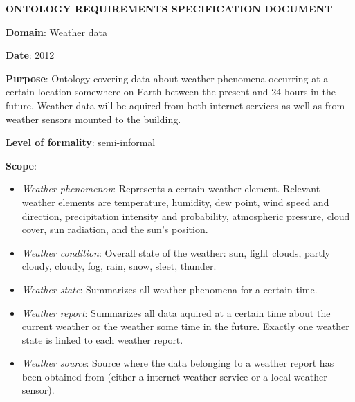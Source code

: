 \begin{mdframed}
\setlength{\parindent}{0pt}
\MakeUppercase{\textbf{Ontology requirements specification document}}

\vspace{.5cm}

\textbf{Domain}: Weather data

\vspace{.2cm}

\textbf{Date}: 2012 %

\vspace{.2cm}

\textbf{Purpose}: Ontology covering data about weather phenomena occurring at a certain location somewhere on Earth between the present and 24 hours in the future. Weather data will be aquired from both internet services as well as from weather sensors mounted to the building.

\vspace{.2cm}

\textbf{Level of formality}: semi-informal %

\vspace{.2cm}

\textbf{Scope}:

\begin{itemize}
  \item \emph{Weather phenomenon}: Represents a certain weather element. Relevant weather elements are temperature, humidity, dew point, wind speed and direction, precipitation intensity and probability, atmospheric pressure, cloud cover, sun radiation, and the sun's position.

  \item \emph{Weather condition}: Overall state of the weather: sun, light clouds, partly cloudy, cloudy, fog, rain, snow, sleet, thunder.
  \item \emph{Weather state}: Summarizes all weather phenomena for a certain time. 
  \item \emph{Weather report}: Summarizes all data aquired at a certain time about the current weather or the weather some time in the future. Exactly one weather state is linked to each weather report.
  \item \emph{Weather source}: Source where the data belonging to a weather report has been obtained from (either a internet weather service or a local weather sensor).
\end{itemize}


\end{mdframed}
